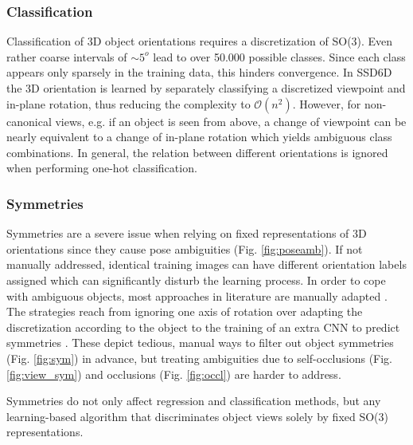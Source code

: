 \subsubsection{Classification} 

Classification of 3D object orientations requires a discretization of SO(3). Even rather coarse intervals of $\sim 5^o$ lead to over 50.000 possible classes. Since each class appears only sparsely in the training data, this hinders convergence. In SSD6D \citep{kehl2017ssd} the 3D orientation is learned by separately classifying a discretized viewpoint and in-plane rotation, thus reducing the complexity to $\mathcal{O}(n^2)$. However, for non-canonical views, e.g. if an object is seen from above, a change of viewpoint can be nearly equivalent to a change of in-plane rotation which yields ambiguous class combinations. In general, the relation between different orientations is ignored when performing one-hot classification.

\subsubsection{Symmetries} 
\label{sec:sym}
Symmetries are a severe issue when relying on fixed representations of 3D orientations since they cause pose ambiguities (Fig. \ref{fig:poseamb}). If not manually addressed, identical training images can have different orientation labels assigned which can significantly disturb the learning process. In order to cope with ambiguous objects, most approaches in literature are manually adapted \citep{wohlhart2015learning,hinterstoisser2012gradient,kehl2017ssd,rad2017bb8}. The strategies reach from ignoring one axis of rotation \citep{wohlhart2015learning,hinterstoisser2012gradient} over adapting the discretization according to the object \citep{kehl2017ssd} to the training of an extra \gls{CNN} to predict symmetries \citep{rad2017bb8}. These depict tedious, manual ways to filter out object symmetries (Fig. \ref{fig:sym}) in advance, but treating ambiguities due to self-occlusions (Fig. \ref{fig:view_sym}) and occlusions (Fig. \ref{fig:occl}) are harder to address. 

Symmetries do not only affect regression and classification methods, but any learning-based algorithm that discriminates object views solely by fixed SO(3) representations.


